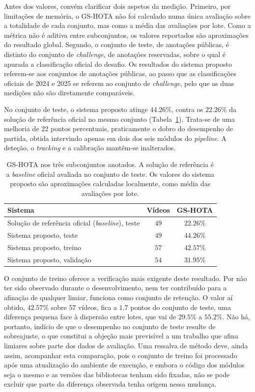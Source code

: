 Antes dos valores, convém clarificar dois aspetos da medição. Primeiro, por limitações de memória, o GS-HOTA não foi calculado numa única avaliação sobre a totalidade de cada conjunto, mas como a média das avaliações por lote. Como a métrica não é aditiva entre subconjuntos, os valores reportados são aproximações do resultado global. Segundo, o conjunto de teste, de anotações públicas, é distinto do conjunto de \emph{challenge}, de anotações reservadas, sobre o qual é apurada a classificação oficial do desafio. Os resultados do sistema proposto referem-se aos conjuntos de anotações públicas, ao passo que as classificações oficiais de 2024 e 2025 se referem ao conjunto de \emph{challenge}, pelo que as duas medições não são diretamente comparáveis.

No conjunto de teste, o sistema proposto atinge $44.26\%$, contra os $22.26\%$ da solução de referência oficial no mesmo conjunto (Tabela~\ref{tab:gshota}). Trata-se de uma melhoria de $22$ pontos percentuais, praticamente o dobro do desempenho de partida, obtida intervindo apenas em dois dos seis módulos do \emph{pipeline}. A deteção, o \emph{tracking} e a calibração mantêm-se inalterados.

\begin{table}[htbp]
    \centering
    \caption{GS-HOTA nos três subconjuntos anotados. A solução de referência é a \emph{baseline}
    oficial avaliada no conjunto de teste. Os valores do sistema proposto são aproximações
    calculadas localmente, como média das avaliações por lote.}
    \label{tab:gshota}
    \begin{tabular}{lcc}
        \hline
        \textbf{Sistema} & \textbf{Vídeos} & \textbf{GS-HOTA} \\
        \hline
        Solução de referência oficial (\emph{baseline}), teste & $49$ & $22.26\%$ \\
        \hline
        Sistema proposto, teste     & $49$ & $44.26\%$ \\
        Sistema proposto, treino    & $57$ & $42.57\%$ \\
        Sistema proposto, validação & $54$ & $31.95\%$ \\
        \hline
    \end{tabular}
\end{table}

O conjunto de treino oferece a verificação mais exigente deste resultado. Por não ter sido observado durante o desenvolvimento, nem ter contribuído para a afinação de qualquer limiar, funciona como conjunto de retenção. O valor aí obtido, $42.57\%$ sobre $57$ vídeos, fica a $1.7$ pontos do conjunto de teste, uma diferença pequena face à dispersão entre lotes, que vai de $29.5\%$ a $55.2\%$. Não há, portanto, indício de que o desempenho no conjunto de teste resulte de sobreajuste, o que constitui a objeção mais previsível a um trabalho que afina limiares sobre parte dos dados de avaliação. Uma ressalva de método deve, ainda assim, acompanhar esta comparação, pois o conjunto de treino foi processado após uma atualização do ambiente de execução, e embora o código dos módulos seja o mesmo e as versões das bibliotecas tenham sido fixadas, não se pode excluir que parte da diferença observada tenha origem nessa mudança.


